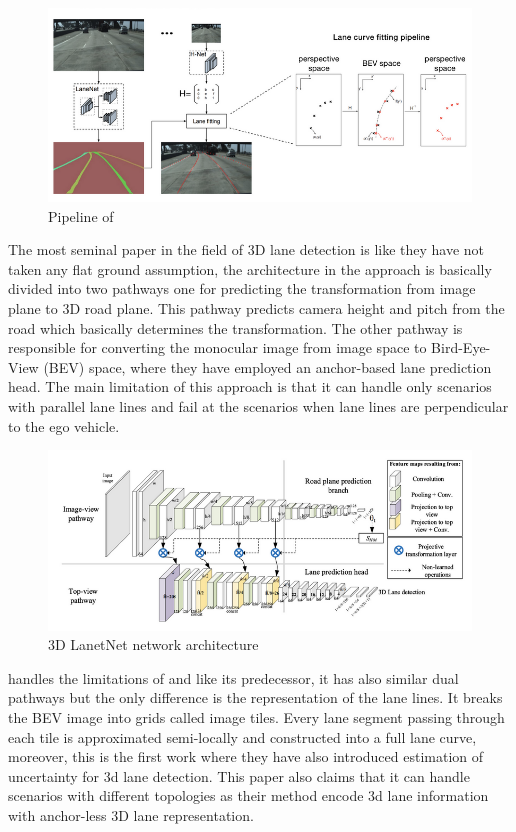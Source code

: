  \begin{figure}[h]
    \centering
    \includegraphics[width=\textwidth]{images/lanenet.png}
    \caption{Pipeline of \cite{DBLP:journals/corr/abs-1802-05591}}
    \end{figure}


The most seminal paper in the field of 3D lane detection is \cite{DBLP:journals/corr/abs-1811-10203} like \cite{DBLP:journals/corr/abs-1802-05591} they have not taken any flat ground assumption, the architecture in the approach is basically divided into two pathways one for predicting the transformation from image plane to 3D road plane. This pathway predicts camera height and pitch from the road which basically determines the transformation. The other pathway is responsible for converting the monocular image from image space to Bird-Eye-View (BEV) space, where they have employed an anchor-based lane prediction head. The main limitation of this approach is that it can handle only scenarios with parallel lane lines and fail at the scenarios when lane lines are perpendicular to the ego vehicle. 

\begin{figure}[h]
    \centering
    \includegraphics[width=\textwidth]{images/3dlanenet.png}
    \caption{\cite{c} 3D LanetNet network architecture}
    \end{figure}

\cite{DBLP:journals/corr/abs-2011-01535} handles the limitations of \cite{DBLP:journals/corr/abs-1811-10203} and like its predecessor, it has also similar dual pathways but the only difference is the representation of the lane lines. It breaks the BEV image into grids called image tiles.
Every lane segment passing through each tile is approximated semi-locally and constructed into a full lane curve, moreover, this is the first work where they have also introduced estimation of uncertainty for 3d lane detection. This paper also claims that it can handle scenarios with different topologies as their method encode 3d lane information with anchor-less 3D lane representation. 

